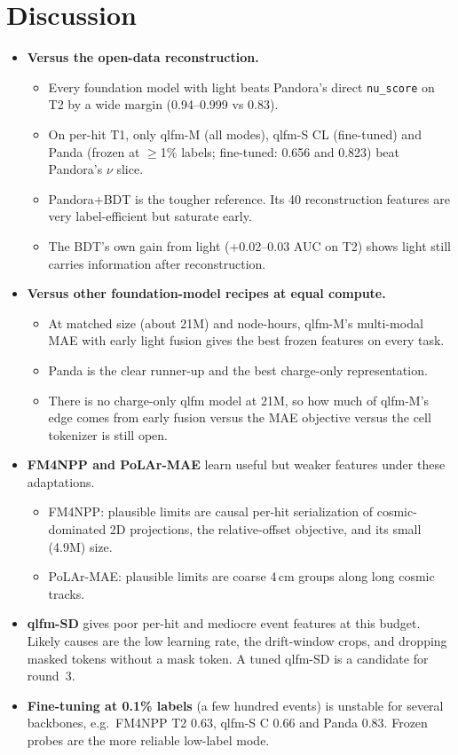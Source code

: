 \documentclass[11pt,a4paper]{article}
\newcommand{\code}[1]{\texttt{\small #1}}
\begin{document}
\section{Discussion}
\begin{itemize}[leftmargin=*]
\item \textbf{Versus the open-data reconstruction.}
  \begin{itemize}
    \item Every foundation model with light beats Pandora's direct \code{nu\_score} on T2 by a wide margin (0.94--0.999 vs 0.83).
    \item On per-hit T1, only qlfm-M (all modes), qlfm-S CL (fine-tuned) and Panda (frozen at $\geq$1\% labels; fine-tuned: 0.656 and 0.823) beat Pandora's $\nu$ slice.
    \item Pandora+BDT is the tougher reference. Its 40 reconstruction features are very label-efficient but saturate early.
    \item The BDT's own gain from light (+0.02--0.03 AUC on T2) shows light still carries information after reconstruction.
  \end{itemize}
\item \textbf{Versus other foundation-model recipes at equal compute.}
  \begin{itemize}
    \item At matched size (about 21M) and node-hours, qlfm-M's multi-modal MAE with early light fusion gives the best frozen features on every task.
    \item Panda is the clear runner-up and the best charge-only representation.
    \item There is no charge-only qlfm model at 21M, so how much of qlfm-M's edge comes from early fusion versus the MAE objective versus the cell tokenizer is still open.
  \end{itemize}
\item \textbf{FM4NPP and PoLAr-MAE} learn useful but weaker features under these adaptations.
  \begin{itemize}
    \item FM4NPP: plausible limits are causal per-hit serialization of cosmic-dominated 2D projections, the relative-offset objective, and its small (4.9M) size.
    \item PoLAr-MAE: plausible limits are coarse 4\,cm groups along long cosmic tracks.
  \end{itemize}
\item \textbf{qlfm-SD} gives poor per-hit and mediocre event features at this budget. Likely causes are the low learning rate, the drift-window crops, and dropping masked tokens without a mask token. A tuned qlfm-SD is a candidate for round~3.
\item \textbf{Fine-tuning at 0.1\% labels} (a few hundred events) is unstable for several backbones, e.g.\ FM4NPP T2 0.63, qlfm-S C 0.66 and Panda 0.83. Frozen probes are the more reliable low-label mode.
\end{itemize}
\end{document}
